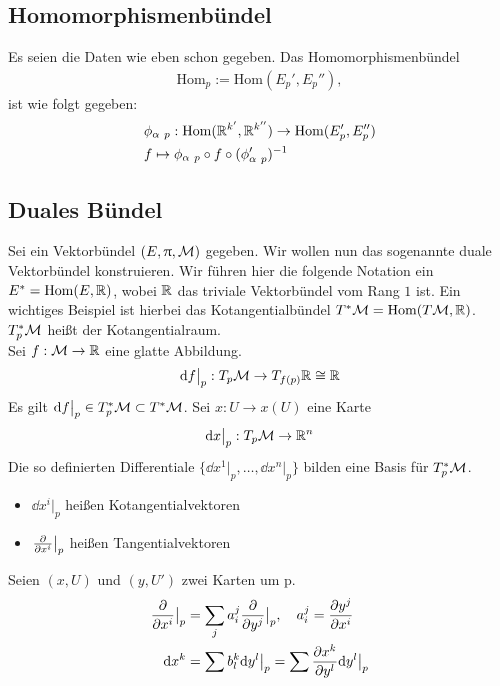 \subsection{Homomorphismenbündel}
Es seien die Daten wie eben schon gegeben.
Das Homomorphismenbündel
\begin{align}
\mathrm{Hom}_p := \mathrm{Hom}(E_{p}', E_{p}''),
\end{align}
ist wie folgt gegeben:
\begin{align}
&\phi_{\alpha \ p} : \mathrm{Hom}(\mathbb{R}^{k'}, \mathbb{R}^{k''}) \to \mathrm{Hom}(E_{p}', E_{p}'')\\
&f \mapsto \phi_{\alpha \ p} \circ f \circ (\phi_{\alpha \ p}')^{-1}
\end{align}

\subsection{Duales Bündel}
Sei ein Vektorbündel $(E, \uppi, \mathcal{M})$ gegeben. 
Wir wollen nun das sogenannte duale Vektorbündel konstruieren.
Wir führen hier die folgende Notation ein $E^* = \mathrm{Hom}(E, \mathbb{R})$, wobei $\mathbb{R}$ das triviale Vektorbündel vom Rang $1$ ist.
Ein wichtiges Beispiel ist hierbei das Kotangentialbündel $T^{*}\mathcal{M} = \mathrm{Hom}(T\mathcal{M} , \mathbb{R})$.
$T^{*}_{p}\mathcal{M}$ heißt der Kotangentialraum.\\
Sei $f: \mathcal{M} \to \mathbb{R}$ eine glatte Abbildung.
\begin{align}
\dd f \big\vert_p : T_p \mathcal{M} \to T_{f(p)}\mathbb{R} \cong \mathbb{R}
\end{align}
Es gilt $\dd f\big\vert_p \in T_p^* \mathcal{M} \subset T^* \mathcal{M}$.
Sei $x: U \to x(U)$ eine Karte 
\begin{align}
\dd x \big\vert_p : T_p \mathcal{M} \to \mathbb{R}^n
\end{align}
Die so definierten Differentiale $\{ \dd x^1 \big\vert_p, \dots , \dd x^n \big\vert_p \}$ bilden eine Basis für $T_p^* \mathcal{M}$.
\begin{itemize}
\item $\dd x^i \big\vert_p$ heißen Kotangentialvektoren
\item $\pdv{x^i} \big\vert_p$ heißen Tangentialvektoren
\end{itemize}
Seien $(x, U)$ und $(y, U')$ zwei Karten um p.
\begin{align}
\pdv{x^i}\big\vert_p &= \sum_j a^j_i \pdv{y^j} \big\vert_p, \quad a^j_i = \pdv{y^j}{x^i} \\
\dd x^k &= \sum b^k_l \dd y^l \big\vert_p = \sum \pdv{x^k}{y^l} \dd y^l \big\vert_p
\end{align}

